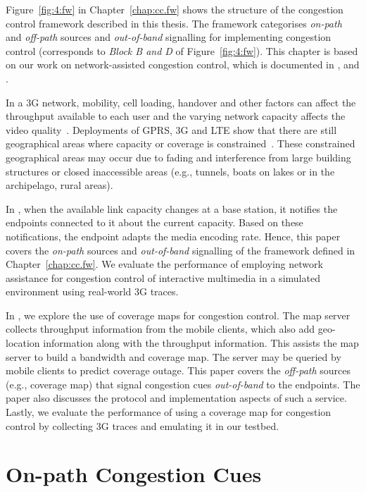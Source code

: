 Figure~\ref{fig:4:fw} in Chapter~\ref{chap:cc.fw} shows the structure of the
congestion control framework described in this thesis. The framework
categorises \emph{on-path} and \emph{off-path} sources and \emph{out-of-band}
signalling for implementing congestion control (corresponds to
\emph{Block B and D} of Figure~\ref{fig:4:fw}). This chapter is based on our
work on network-assisted congestion control, which is documented in
,  and \cite{glass:patent}.

In a 3G network, mobility, cell loading, handover and other factors can
affect the throughput available to each user and the varying network capacity
affects the video quality~\cite{diaz2007evaluating}. Deployments of GPRS, 3G
and LTE show that there are still geographical areas where capacity or
coverage is constrained~\cite{Curcio:glass, 6576402}. These constrained
geographical areas may occur due to fading and interference from large
building structures or closed inaccessible areas (e.g., tunnels, boats on
lakes or in the archipelago, rural areas).

In , when the available link capacity changes at a base
station, it notifies the endpoints connected to it about the current capacity.
Based on these notifications, the endpoint adapts the media encoding rate. Hence,
this paper covers the \emph{on-path} sources and \emph{out-of-band} signalling
of the framework defined in Chapter~\ref{chap:cc.fw}. We evaluate the
performance of employing network assistance for congestion control of interactive
multimedia in a simulated environment using real-world 3G traces.

In , we explore the use of coverage maps for congestion
control. The map server collects throughput information from the mobile
clients, which also add geo-location information along with the throughput
information. This assists the map server to build a bandwidth and coverage
map. The server may be queried by mobile clients to predict coverage outage.
This paper covers the \emph{off-path} sources (e.g., coverage map) that
signal congestion cues \emph{out-of-band} to the endpoints. The paper also
discusses the protocol and implementation aspects of such a service. Lastly,
we evaluate the performance of using a coverage map for congestion control by
collecting 3G traces and emulating it in our testbed.

\section{On-path Congestion Cues}

